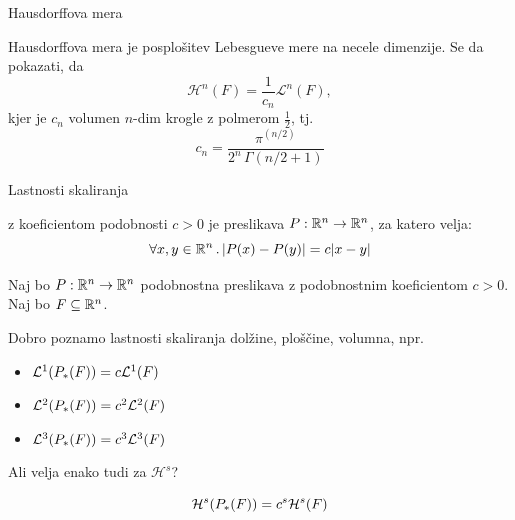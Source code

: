 \documentclass[10pt]{beamer}
\begin{document}
\begin{frame}[t]{Hausdorffova mera}
    \begin{opomba}
        Hausdorffova mera je posplošitev Lebesgueve mere na necele dimenzije. Se da pokazati, da 
        \[\mathcal{H}^n(F) = \frac{1}{c_n} \mathcal{L}^n(F),\]
        kjer je \(c_n\) volumen \(n\)-dim krogle z polmerom \(\frac{1}{2}\), tj. 
        \[c_n = \frac{\pi^{(n/2)}}{2^n \, \Gamma(n/2 + 1)}\]
    \end{opomba}  
\end{frame}

\begin{frame}[t]{Lastnosti skaliranja}
     {
        \begin{definicija}
             z koeficientom podobnosti \(c > 0\) je preslikava \(P: \mathbb{R}^n \to \mathbb{R}^n\), za katero velja:
            \[\forall x, y \in \mathbb{R}^n \,.\, |P(x) - P(y)| = c|x-y|\]
        \end{definicija}
    }
    \pause
    Naj bo \(P: \mathbb{R}^n \to \mathbb{R}^n\) podobnostna preslikava z podobnostnim koeficientom \(c > 0\). Naj bo \(F \subseteq \mathbb{R}^n\).
    
     {
        Dobro poznamo lastnosti skaliranja dolžine, ploščine, volumna, npr.
        \begin{itemize}
            \item \(\mathcal{L}^1(P_{*}(F)) = c \mathcal{L}^1(F)\)
            \item \(\mathcal{L}^2(P_{*}(F)) = c^2 \mathcal{L}^2(F)\)
            \item \(\mathcal{L}^3(P_{*}(F)) = c^3 \mathcal{L}^3(F)\)
        \end{itemize}
        Ali velja enako tudi za \(\mathcal{H}^s\)?
    }
    \pause
    \begin{trditev}
        \[\mathcal{H}^s(P_{*}(F)) = c^s \mathcal{H}^s(F)\]
    \end{trditev}   
\end{frame}
\end{document}
